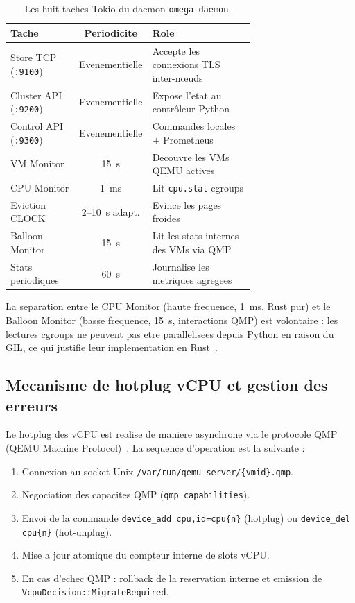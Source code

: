 \begin{table}[htbp]
    \centering
    \caption{Les huit taches Tokio du daemon \texttt{omega-daemon}.}
    \label{tab:tokio-tasks}
    \begin{tabular}{p{0.28\linewidth} c p{0.42\linewidth}}
        \toprule
        \textbf{Tache} & \textbf{Periodicite} & \textbf{Role} \\
        \midrule
        Store TCP (\texttt{:9100}) & Evenementielle & Accepte les connexions TLS inter-nœuds \\
        Cluster API (\texttt{:9200}) & Evenementielle & Expose l'etat au contrôleur Python \\
        Control API (\texttt{:9300}) & Evenementielle & Commandes locales + Prometheus \\
        VM Monitor & 15~s & Decouvre les VMs QEMU actives \\
        CPU Monitor & 1~ms & Lit \texttt{cpu.stat} cgroups \\
        Eviction CLOCK & 2--10~s adapt. & Evince les pages froides \\
        Balloon Monitor & 15~s & Lit les stats internes des VMs via QMP \\
        Stats periodiques & 60~s & Journalise les metriques agregees \\
        \bottomrule
    \end{tabular}
\end{table}

La separation entre le CPU Monitor (haute frequence, 1~ms, Rust pur) et le Balloon Monitor (basse frequence, 15~s, interactions QMP) est volontaire : les lectures cgroups ne peuvent pas etre parallelisees depuis Python en raison du GIL, ce qui justifie leur implementation en Rust~\cite{rust_lang}.

\subsection{Mecanisme de hotplug vCPU et gestion des erreurs}
\label{subsec:impl-hotplug}

Le hotplug des vCPU est realise de maniere asynchrone via le protocole QMP (QEMU Machine Protocol)~\cite{qemu_doc}. La sequence d'operation est la suivante :

\begin{enumerate}
    \item Connexion au socket Unix \texttt{/var/run/qemu-server/\{vmid\}.qmp}.
    \item Negociation des capacites QMP (\texttt{qmp\_capabilities}).
    \item Envoi de la commande \texttt{device\_add cpu,id=cpu\{n\}} (hotplug) ou \texttt{device\_del cpu\{n\}} (hot-unplug).
    \item Mise a jour atomique du compteur interne de slots vCPU.
    \item En cas d'echec QMP : rollback de la reservation interne et emission de \texttt{VcpuDecision::MigrateRequired}.
\end{enumerate}

